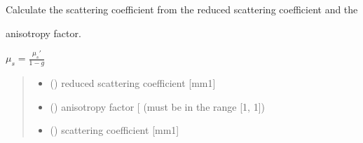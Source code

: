 \documentclass[letterpaper,10pt,english]{sphinxmanual}
\begin{document}

\begin{fulllineitems}
\label{\detokenize{04_scattering_coefficient:skinoptics.scattering_coefficient.mus_from_rmus}}
\pysigstartsignatures
{}
\pysigstopsignatures
\begin{DUlineblock}{0em}
\item[] Calculate the scattering coefficient from the reduced scattering coefficient and the 
\item[] anisotropy factor.
\end{DUlineblock}

\sphinxAtStartPar
\(\mu_s = \frac{\mu_s'}{1-g}\)
\begin{quote}\begin{description}
\begin{itemize}
\item {} 
\sphinxAtStartPar
{} () \textendash{} reduced scattering coefficient {[}mm\sphinxhyphen{}1{]}

\item {} 
\sphinxAtStartPar
{} () \textendash{} anisotropy factor {[}\sphinxhyphen{}{]} (must be in the range {[}\sphinxhyphen{}1, 1{]})

\end{itemize}

\sphinxAtStartPar
\begin{itemize}
\item {} 
\sphinxAtStartPar
{} () \textendash{} scattering coefficient {[}mm\sphinxhyphen{}1{]}

\end{itemize}


\end{description}\end{quote}

\end{fulllineitems}
\end{document}
